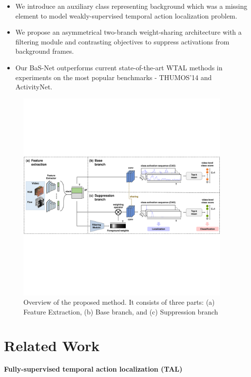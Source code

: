 \documentclass[letterpaper]{article} %
\begin{document}
\begin{itemize}
    \item We introduce an auxiliary class representing background which was a missing element to model weakly-supervised temporal action localization problem.
    \item We propose an asymmetrical two-branch weight-sharing architecture with a filtering module and contrasting objectives to suppress activations from background frames.
    \item Our BaS-Net outperforms current state-of-the-art WTAL methods in experiments on the most popular benchmarks - THUMOS'14 and ActivityNet.
\end{itemize}

\begin{figure}[t]
  \centering
  \includegraphics[clip=true, width=0.95\textwidth]{figure_2.pdf}
  \caption{Overview of the proposed method. It consists of three parts: (a) Feature Extraction, (b) Base branch, and (c) Suppression branch}
  \label{fig:main_architecture}
\end{figure}

\section{Related Work}

\paragraph{Fully-supervised temporal action localization (TAL)}
\end{document}
